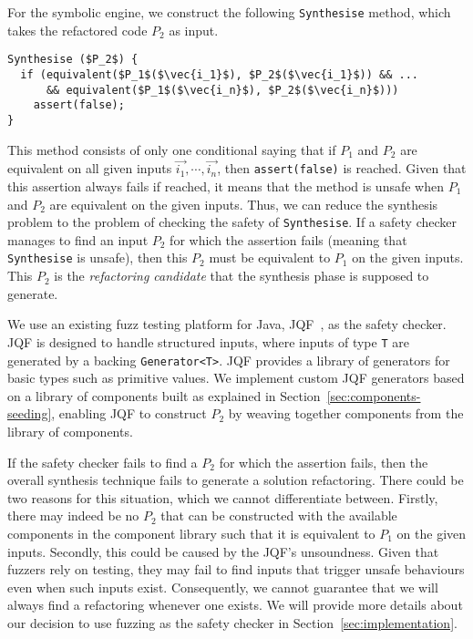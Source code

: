 \documentclass[sigconf,review,anonymous]{acmart}
\begin{document}
For the symbolic engine, we construct the following \texttt{Synthesise} method, which
takes the refactored code $P_2$ as input.

\begin{lstlisting}[mathescape=true,showstringspaces=false]
Synthesise ($P_2$) {
  if (equivalent($P_1$($\vec{i_1}$), $P_2$($\vec{i_1}$)) && ...
      && equivalent($P_1$($\vec{i_n}$), $P_2$($\vec{i_n}$)))
    assert(false);
}
\end{lstlisting}

This method consists of only one conditional saying that if $P_1$ and $P_2$ are equivalent on all given inputs $\vec{i_1}, \cdots, \vec{i_n}$, then \texttt{assert(false)} is reached.
Given that this assertion always fails if reached, it means that the method is unsafe when $P_1$ and $P_2$ are equivalent on the given inputs.
Thus, we can reduce the synthesis problem to the problem of checking the safety of \texttt{Synthesise}. If a safety checker manages to
find an input $P_2$ for which the assertion fails (meaning that \texttt{Synthesise} is unsafe), then this $P_2$ must be equivalent to $P_1$ on the given inputs. This $P_2$ is the {\em refactoring candidate}
that the synthesis phase is supposed to generate.

We use an existing fuzz testing platform for Java, JQF~\cite{DBLP:conf/issta/PadhyeLS19},
as the safety checker. JQF is designed to handle structured inputs, where inputs of type \texttt{T}
are generated by a backing \texttt{Generator<T>}. JQF provides a library of
generators for basic types such as primitive values. We implement custom
JQF generators based on a library of components built as explained in Section~\ref{sec:components-seeding},
enabling JQF to construct $P_2$ by weaving together components from the library of components.

If the safety checker fails to find a $P_2$ for which the assertion fails, then the overall synthesis technique fails to generate a solution refactoring.
There could be two reasons for this situation, which we cannot differentiate between.
Firstly, there may indeed be no $P_2$ that can be constructed with the available components in the component library such that
it is equivalent to $P_1$ on the given inputs. Secondly, this could be caused by the JQF's unsoundness.
Given that fuzzers rely on testing, they may fail to find inputs that trigger unsafe behaviours even when such inputs exist.
Consequently, we cannot guarantee that we will always find a refactoring whenever one exists. We will provide more details about our decision to use fuzzing as the safety checker in 
Section~\ref{sec:implementation}.
\end{document}
